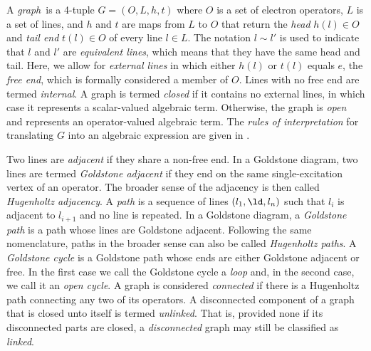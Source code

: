 \documentclass[11pt,fleqn]{article}
\numberwithin{equation}{section}
\begin{document}
\begin{dfn}\label{dfn:graph}
A \textit{graph}\footnotemark\
is a 4-tuple $G=(O,L,h,t)$ where $O$ is a set of electron operators, $L$ is a set of lines, and $h$ and $t$ are maps from $L$ to $O$ that return the \textit{head} $h(l)\in O$ and \textit{tail end} $t(l)\in O$ of every line $l\in L$.
The notation $l\sim l'$ is used to indicate that $l$ and $l'$ are \textit{equivalent lines}, which means that they have the same head and tail.
Here, we allow for \textit{external lines} in which either $h(l)$ or $t(l)$ equals $e$, the \textit{free end}, which is formally considered a member of $O$.
Lines with no free end are termed \textit{internal}.
A graph is termed \textit{closed} if it contains no external lines, in which case it represents a scalar-valued algebraic term.
Otherwise, the graph is \textit{open} and represents an operator-valued algebraic term.
The \textit{rules of interpretation} for translating $G$ into an algebraic expression are given in .
\end{dfn}

\begin{dfn}
Two lines are \textit{adjacent} if they share a non-free end.
In a Goldstone diagram, two lines are termed \textit{Goldstone adjacent} if they end on the same single-excitation vertex of an operator.
The broader sense of the adjacency is then called \textit{Hugenholtz adjacency}.
A \textit{path} is a sequence of lines $(l_1,\ld,l_n)$ such that $l_i$ is adjacent to $l_{i+1}$ and no line is repeated.
In a Goldstone diagram, a \textit{Goldstone path} is a path whose lines are Goldstone adjacent.
Following the same nomenclature, paths in the broader sense can also be called \textit{Hugenholtz paths}.
A \textit{Goldstone cycle} is a Goldstone path whose ends are either Goldstone adjacent or free.
In the first case we call the Goldstone cycle a \textit{loop} and, in the second case, we call it an \textit{open cycle}.
A graph is considered \textit{connected} if there is a Hugenholtz path connecting any two of its operators.
A disconnected component of a graph that is closed unto itself is termed \textit{unlinked}.
That is, provided none if its disconnected parts are closed, a \textit{disconnected} graph may still be classified as \textit{linked}.
\end{dfn}
\end{document}
